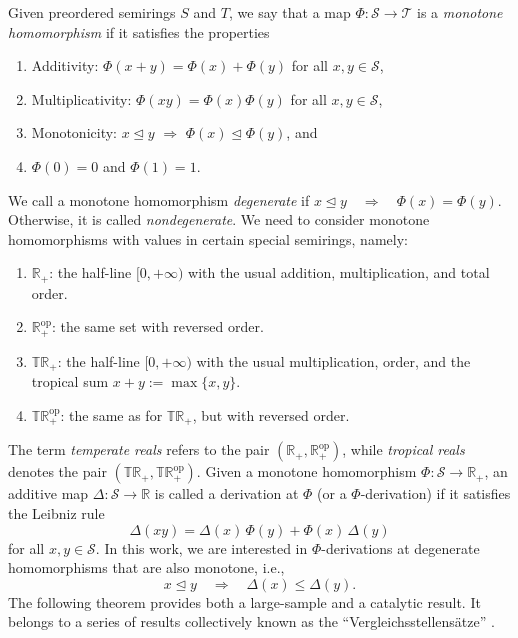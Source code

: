 \documentclass[aps,pra,11pt,onecolumn,nofootinbib,tightenlines]{revtex4-2}
\theoremstyle{definition}
\newcommand{\cS}{\mathcal{S}}
\newcommand{\rleq}{\trianglelefteq}
\begin{document}
Given preordered semirings $S$ and $T$, we say that a map $\Phi:\cS\to \mathcal{T}$ is a {\it monotone homomorphism} if it satisfies the properties
\begin{enumerate}
\item Additivity: $\Phi(x+y)=\Phi(x)+\Phi(y)$ for all $x,y\in \cS$,
\item Multiplicativity: $\Phi(xy)=\Phi(x)\Phi(y)$ for all $x,y\in \cS$,
\item Monotonicity: $x\rleq y$ $\Rightarrow$ $\Phi(x)\rleq\Phi(y)$, and
\item $\Phi(0)=0$ and $\Phi(1)=1$.
\end{enumerate}
We call a monotone homomorphism \textit{degenerate} if $ x \rleq y \quad \Rightarrow \quad \Phi(x) = \Phi(y)$. Otherwise, it is called \textit{nondegenerate}.
We need to consider monotone homomorphisms with values in certain special semirings, namely:
\begin{enumerate}
    \item $\mathbb{R}_+$: the half-line $[0,+\infty)$ with the usual addition, multiplication, and total order.
    \item $\mathbb{R}_+^{\mathrm{op}}$: the same set with reversed order.
    \item $\mathbb{T}\mathbb{R}_+$: the half-line $[0,+\infty)$ with the usual multiplication, order, and the tropical sum $x + y := \max\{x,y\}$.
    \item $\mathbb{T}\mathbb{R}_+^{\mathrm{op}}$: the same as for $\mathbb{T}\mathbb{R}_+$, but with reversed order.
\end{enumerate}
The term \emph{temperate reals} refers to the pair $(\mathbb{R}_+, \mathbb{R}_+^{\mathrm{op}})$, while \emph{tropical reals} denotes the pair $(\mathbb{T}\mathbb{R}_+, \mathbb{T}\mathbb{R}_+^{\mathrm{op}})$.
Given a monotone homomorphism $\Phi: \cS \to \mathbb{R}_+$, an additive map $\Delta: \cS \to \mathbb{R}$ is called a derivation at $\Phi$ (or a $\Phi$-derivation) if it satisfies the Leibniz rule
\begin{equation}
    \Delta(xy) = \Delta(x)\,\Phi(y) + \Phi(x)\,\Delta(y)
\end{equation}
for all $x, y \in \cS$.
In this work, we are interested in $\Phi$-derivations at degenerate homomorphisms that are also monotone, i.e.,
\begin{equation}
    x \rleq y \quad \Rightarrow \quad \Delta(x) \leq \Delta(y).
\end{equation}
The following theorem provides both a large-sample and a catalytic result. It belongs to a series of results collectively known as the ``Vergleichsstellens\"{a}tze'' \cite{fritz2023abstractII}.
\end{document}
